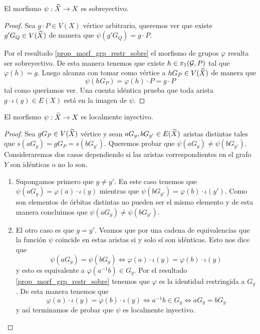 \documentclass[tesis.tex]{subfiles}
\begin{document}
\begin{prop}\label{prop_psi_sobre}
	El morfismo $\psi: \widetilde X \to X$ es sobreyectivo.
\end{prop}
\begin{proof}
	Sea $g \cdot P \in V(X)$ vértice arbitrario, queremos ver que existe $g' G_{Q} \in V(\widetilde X)$ de manera que $\psi(g' G_{Q}) = g \cdot P$.
	
	Por el resultado \ref{prop_morf_grp_restr_sobre} el morfismo de grupos $\varphi$ resulta ser sobreyectivo.
	De esta manera tenemos que existe $h \in \pi_1({\cal G},P)$ tal que $\varphi(h) = g$. 
	Luego alcanza con tomar como vértice a $h G_P \in V(\widetilde X) $ de manera que 
	\[
	\psi(h G_P ) = \varphi(h) \cdot P = g \cdot P 
	\]
	tal como queríamos ver.
	Una cuenta idéntica prueba que toda arista $g \cdot \iota(y) \in E(X)$ está en la imagen de $\psi$. 
	
\end{proof}


\begin{prop}\label{prop_psi_loc_iny}
	El morfismo $\psi:\widetilde X \to X$ es localmente inyectivo.
\end{prop}
	
\begin{proof}
	Sea $gG_{P} \in V(\widetilde X)$ vértice y sean $aG_{y},bG_{y' }\in E(\widetilde X)$ aristas distintas tales que $s(aG_{y}) = gG_{P} = s(bG_{y'})$.
	Queremos probar que $\psi(aG_{y}) \neq \psi(bG_{y'})$.
	Consideraremos dos casos dependiendo si las aristas correspondientes en el grafo $Y$ son idénticas o no lo son.
	
	\begin{enumerate}
		\item Supongamos primero que $y \neq y'$.
		En este caso tenemos que $\psi(aG_{y}) = \varphi(a) \cdot \iota (y)$ mientras que $\psi(bG_{y'}) = \varphi(b) \cdot \iota (y')$.
		Como son elementos de órbitas distintas no pueden ser el mismo elemento y de esta manera concluimos que $\psi(aG_{y}) \neq \psi(bG_{y'}).$
		
		\item El otro caso es que $y=y'$. 
		Veamos que por una cadena de equivalencias que la función $\psi$ coincide en estas aristas si y solo sí son idénticas.
		Esto nos dice que
		\[
		\psi(aG_{y}) = \psi(bG_{y}) \iff \varphi(a) \cdot  \iota(y) = \varphi(b)\cdot \iota(y)
		\]
		y esto es equivalente a $\varphi(a^{-1}b) \in G_{y}$.
		Por el resultado \ref{prop_morf_grp_restr_sobre} tenemos que $\varphi$ es la identidad restringida a $G_{y}$.
		De esta manera tenemos que
		\[
			\varphi(a) \cdot  \iota(y) = \varphi(b)\cdot \iota(y) \iff  a^{-1}b \in G_{y} \iff aG_{y} = bG_{y}
		\]
		y así terminamos de probar que $\psi$ es localmente inyectivo.
		
	\end{enumerate}
\end{proof}	
	
\end{document}
